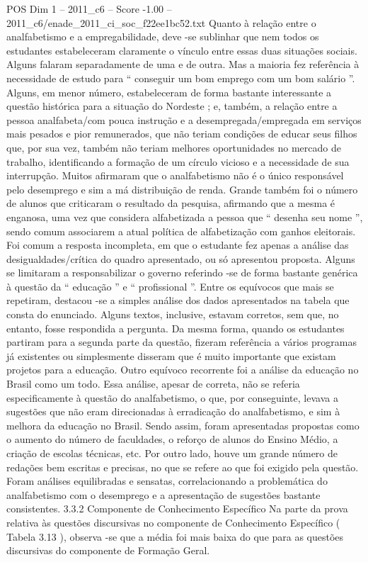 \begin{textsample}{POS Dim 1 – 2011\_c6 – Score -1.00 – 2011\_c6/enade\_2011\_ci\_soc\_f22ee1bc52.txt}
Quanto à relação entre o analfabetismo e a empregabilidade, deve -se sublinhar que nem todos os estudantes estabeleceram claramente o vínculo entre essas duas situações sociais.
Alguns falaram separadamente de uma e de outra.
Mas a maioria fez referência à necessidade de estudo para “ conseguir um bom emprego com um bom salário ”.
Alguns, em menor número, estabeleceram de forma bastante interessante a questão histórica para a situação do Nordeste ; e, também, a relação entre a pessoa analfabeta/com pouca instrução e a desempregada/empregada em serviços mais pesados e pior remunerados, que não teriam condições de educar seus filhos que, por sua vez, também não teriam melhores oportunidades no mercado de trabalho, identificando a formação de um círculo vicioso e a necessidade de sua interrupção.
Muitos afirmaram que o analfabetismo não é o único responsável pelo desemprego e sim a má distribuição de renda.
Grande também foi o número de alunos que criticaram o resultado da pesquisa, afirmando que a mesma é enganosa, uma vez que considera alfabetizada a pessoa que “ desenha seu nome ”, sendo comum associarem a atual política de alfabetização com ganhos eleitorais.
Foi comum a resposta incompleta, em que o estudante fez apenas a análise das desigualdades/crítica do quadro apresentado, ou só apresentou proposta.
Alguns se limitaram a responsabilizar o governo referindo -se de forma bastante genérica à questão da “ educação ” e “ profissional ”.
Entre os equívocos que mais se repetiram, destacou -se a simples análise dos dados apresentados na tabela que consta do enunciado.
Alguns textos, inclusive, estavam corretos, sem que, no entanto, fosse respondida a pergunta.
Da mesma forma, quando os estudantes partiram para a segunda parte da questão, fizeram referência a vários programas já existentes ou simplesmente disseram que é muito importante que existam projetos para a educação.
Outro equívoco recorrente foi a análise da educação no Brasil como um todo.
Essa análise, apesar de correta, não se referia especificamente à questão do analfabetismo, o que, por conseguinte, levava a sugestões que não eram direcionadas à erradicação do analfabetismo, e sim à melhora da educação no Brasil.
Sendo assim, foram apresentadas propostas como o aumento do número de faculdades, o reforço de alunos do Ensino Médio, a criação de escolas técnicas, etc.
Por outro lado, houve um grande número de redações bem escritas e precisas, no que se refere ao que foi exigido pela questão.
Foram análises equilibradas e sensatas, correlacionando a problemática do analfabetismo com o desemprego e a apresentação de sugestões bastante consistentes. 3.3.2 Componente de Conhecimento Específico Na parte da prova relativa às questões discursivas no componente de Conhecimento Específico ( Tabela 3.13 ), observa -se que a média foi mais baixa do que para as questões discursivas do componente de Formação Geral.

\end{textsample}
